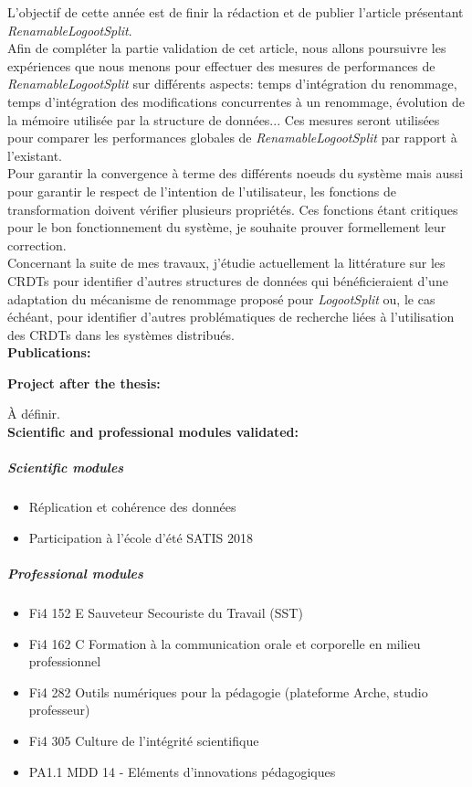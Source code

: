 \documentclass[12pt]{article}
\newcommand{\commentaire}[1]{}
\begin{document}
L'objectif de cette année est de finir la rédaction et de publier l'article présentant \emph{RenamableLogootSplit}.
\\

Afin de compléter la partie validation de cet article, nous allons poursuivre les expériences que nous menons pour effectuer des mesures de performances de \emph{RenamableLogootSplit} sur différents aspects: temps d'intégration du renommage, temps d'intégration des modifications concurrentes à un renommage, évolution de la mémoire utilisée par la structure de données...
Ces mesures seront utilisées pour comparer les performances globales de \emph{RenamableLogootSplit} par rapport à l'existant.
\\

Pour garantir la convergence à terme des différents noeuds du système mais aussi pour garantir le respect de l'intention de l'utilisateur, les fonctions de transformation doivent vérifier plusieurs propriétés.
Ces fonctions étant critiques pour le bon fonctionnement du système, je souhaite prouver formellement leur correction.
\\

Concernant la suite de mes travaux, j'étudie actuellement la littérature sur les \acp{CRDT} pour identifier d'autres structures de données qui bénéficieraient d'une adaptation du mécanisme de renommage proposé pour \emph{LogootSplit} ou, le cas échéant, pour identifier d'autres problématiques de recherche liées à l'utilisation des \acp{CRDT} dans les systèmes distribués.
\\

\noindent\textbf{Publications:}
\commentaire{%
  if any}


\nocite{*}

\noindent\textbf{Project after the thesis:}
\commentaire{%
  for 3rd year (and beyond) PhD students: professional project\\}
À définir.
\\

\noindent\textbf{Scientific and professional modules validated:}
\commentaire{%
  list of all modules validated from the beginning of the thesis (do
  not forget to add them in Adum, together with your publications)}
\subparagraph{Scientific modules}
  \begin{itemize}
      \item Réplication et cohérence des données
      \item Participation à l'école d'été SATIS 2018
  \end{itemize}
\subparagraph{Professional modules}
  \begin{itemize}
      \item Fi4 152 E Sauveteur Secouriste du Travail (SST)
      \item Fi4 162 C Formation à la communication orale et corporelle en milieu professionnel
      \item Fi4 282 Outils numériques pour la pédagogie (plateforme Arche, studio professeur)
      \item Fi4 305 Culture de l’intégrité scientifique
      \item PA1.1 MDD 14 - Eléments d’innovations pédagogiques
  \end{itemize}
\end{document}
